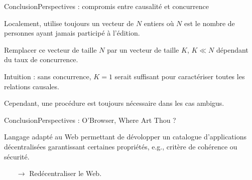 \begin{frame}{Conclusion}{Perspectives : compromis entre causalité et concurrence}
  
  Localement, \CRATE utilise toujours un vecteur de $N$ entiers où $N$ est le
  nombre de personnes ayant jamais participé à l'édition.
  
  \vspace{0.5cm}

  Remplacer ce vecteur de taille $N$ par un vecteur de taille $K$, $K\ll N$
  dépendant du taux de concurrence.

  \vspace{0.5cm}

  Intuition : sans concurrence, $K=1$ serait suffisant pour caractériser toutes
  les relations causales.

  \vspace{0.5cm}

  Cependant, une procédure est toujours nécessaire dans les cas ambigus.

\end{frame}


\begin{frame}{Conclusion}{Perspectives : O'Browser, Where Art Thou ?}

  Langage adapté au Web permettant de dévolopper un catalogue d'applications
  décentralisées garantissant certaines propriétés, e.g., critère de cohérence
  ou sécurité.

  \vspace{0.25cm}
  
  \begin{itemize}
  \item [$\rightarrow$] Redécentraliser le Web.
  \end{itemize}

  \begin{center}
    
  \end{center}

\end{frame}